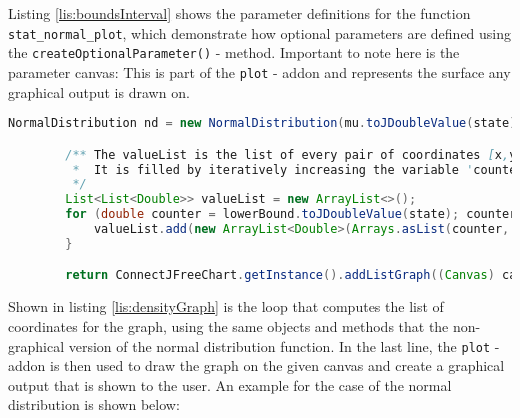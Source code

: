Listing \ref{lis:boundsInterval} shows the parameter definitions for the function \lstinline{stat_normal_plot}, which demonstrate how optional parameters are defined using the \lstinline{createOptionalParameter()} - method. Important to note here is the parameter canvas: This is part of the \lstinline{plot} - addon and represents the surface any graphical output is drawn on.

\begin{center}
	\begin{lstlisting}[caption={Computation of propability density graph for Normal Distributions}, language={java}, label=lis:densityGraph]
		NormalDistribution nd = new NormalDistribution(mu.toJDoubleValue(state), sigma.toJDoubleValue(state));

        /** The valueList is the list of every pair of coordinates [x,y] that the graph consists of.
         *  It is filled by iteratively increasing the variable 'counter' (x), and calculating the density for every new value of 'counter' (y).
         */
        List<List<Double>> valueList = new ArrayList<>();
        for (double counter = lowerBound.toJDoubleValue(state); counter < upperBound.toJDoubleValue(state); counter += interval.toJDoubleValue(state)) {
            valueList.add(new ArrayList<Double>(Arrays.asList(counter, nd.density(counter))));
        }

        return ConnectJFreeChart.getInstance().addListGraph((Canvas) canvas, valueList, "Probability Density Function (mean: " + mu.toString() + ", standard deviation: " + sigma.toString(), Defaults.DEFAULT_COLOR_SCHEME, false);
	\end{lstlisting}
\end{center}

Shown in listing \ref{lis:densityGraph} is the loop that computes the list of coordinates for the graph, using the same objects and methods that the non-graphical version of the normal distribution function. In the last line, the \lstinline{plot} - addon is then used to draw the graph on the given canvas and create a graphical output that is shown to the user. An example for the case of the normal distribution is shown below:

